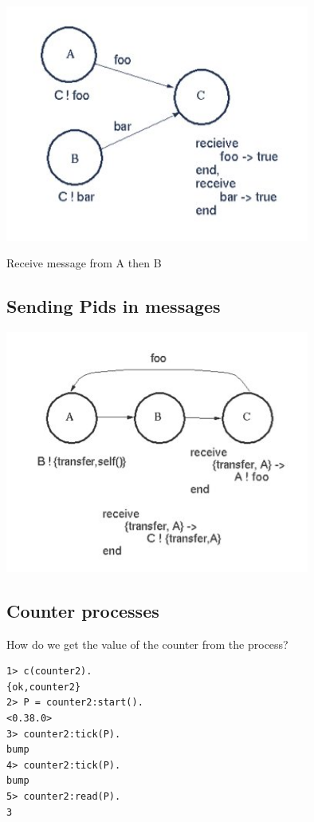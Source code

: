 \documentclass[12pt]{article}
\begin{document}
\begin{itemize}
\includegraphics[width=10cm]{images/msgs3.jpg}

Receive message from A then B

\subsection{Sending Pids in messages}

\includegraphics[width=10cm]{images/msgs4.jpg}

\subsection{Counter processes}

How do we get the value of the counter from the process?



\begin{verbatim}
1> c(counter2).
{ok,counter2}
2> P = counter2:start().
<0.38.0>
3> counter2:tick(P).
bump
4> counter2:tick(P).
bump
5> counter2:read(P).
3
\end{verbatim}


\end{itemize}
\end{document}
